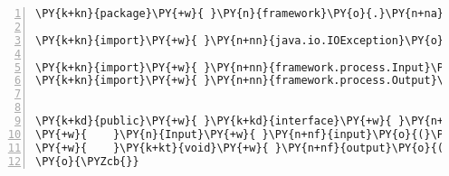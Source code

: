 \begin{Verbatim}[commandchars=\\\{\},numbers=left,firstnumber=1,stepnumber=1,frame=single,fontsize=\small]
\PY{k+kn}{package}\PY{+w}{ }\PY{n}{framework}\PY{o}{.}\PY{n+na}{io}\PY{o}{;}

\PY{k+kn}{import}\PY{+w}{ }\PY{n+nn}{java.io.IOException}\PY{o}{;}

\PY{k+kn}{import}\PY{+w}{ }\PY{n+nn}{framework.process.Input}\PY{o}{;}
\PY{k+kn}{import}\PY{+w}{ }\PY{n+nn}{framework.process.Output}\PY{o}{;}


\PY{k+kd}{public}\PY{+w}{ }\PY{k+kd}{interface}\PY{+w}{ }\PY{n+nc}{InputAndOutput}\PY{+w}{ }\PY{o}{\PYZob{}}
\PY{+w}{    }\PY{n}{Input}\PY{+w}{ }\PY{n+nf}{input}\PY{o}{(}\PY{o}{)}\PY{+w}{ }\PY{k+kd}{throws}\PY{+w}{ }\PY{n}{IOException}\PY{o}{;}
\PY{+w}{    }\PY{k+kt}{void}\PY{+w}{ }\PY{n+nf}{output}\PY{o}{(}\PY{n}{Output}\PY{+w}{ }\PY{n}{output}\PY{o}{)}\PY{o}{;}
\PY{o}{\PYZcb{}}
\end{Verbatim}
